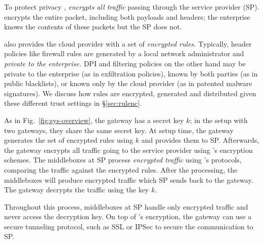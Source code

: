 To protect privacy , \sys \textit{encrypts all traffic} passing through the service provider (SP).
\sys encrypts the entire packet, including both payloads and headers; the enterprise knows the contents of these packets but the SP does not.

\sys also provides the cloud provider with a set of {\it encrypted rules}.
Typically, header policies like firewall rules are generated by a local network administrator and {\it private to the enterprise.}
DPI and filtering policies on the other hand may be private to the enterprise (as in exfiltration policies), known by both parties (as in  public blacklists), or known only by the cloud provider (as in  patented malware signatures).
We discuss how rules are encrypted, generated and distributed given these different trust settings in \S\ref{sec:rulenc}.

As in Fig.~\ref{fig:sys-overview}, the gateway has a secret key $k$; in the setup with two gateways, they share
the same secret key. 
At setup time, the gateway generates the set of encrypted rules using $k$ and provides them to SP.
Afterwards, the gateway encrypts all traffic going to the service provider using \sys's encryption schemes.
The middleboxes at SP process {\em encrypted traffic} using \sys's protocols, comparing the traffic against the encrypted rules. 
After the processing, the middleboxes
will produce encrypted traffic which SP sends back to the gateway. The gateway decrypts the traffic using the key $k$.

Throughout this process, middleboxes at SP handle only encrypted traffic and never access the decryption key. 
On top of \sys's encryption, the gateway can use a secure tunneling protocol, such as SSL or IPSec to secure the communication to SP.

